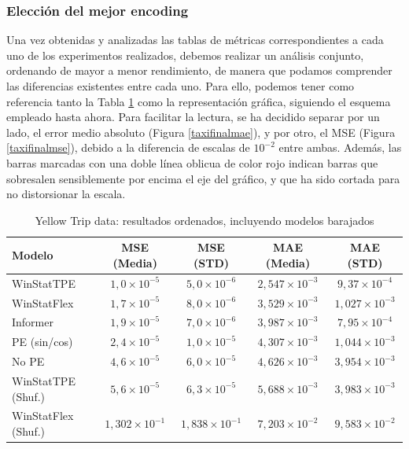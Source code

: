 \subsubsection{Elección del mejor encoding}

Una vez obtenidas y analizadas las tablas de métricas correspondientes a cada uno de los experimentos realizados, debemos realizar un análisis conjunto, ordenando de mayor a menor rendimiento, de manera que podamos comprender las diferencias existentes entre cada uno. Para ello, podemos tener como referencia tanto la Tabla \ref{taxifinal} como la representación gráfica, siguiendo el esquema empleado hasta ahora. Para facilitar la lectura, se ha decidido separar por un lado, el error medio absoluto (Figura \ref{taxifinalmae}), y por otro, el MSE (Figura \ref{taxifinalmse}), debido a la diferencia de escalas de $10^{-2}$ entre ambas. Además, las barras marcadas con una doble línea oblicua de color rojo indican barras que sobresalen sensiblemente por encima el eje del gráfico, y que ha sido cortada para no distorsionar la escala.\\


\begin{table}[!ht]
	\centering
	\begin{tabular}{l|c|c|c|c}
		\toprule
		Modelo & MSE (Media) & MSE (STD) & MAE (Media) & MAE (STD) \\
		\midrule
		WinStatTPE & $1,0 \times 10^{-5}$ & $5,0 \times 10^{-6}$ & $2,547 \times 10^{-3}$ & $9,37 \times 10^{-4}$ \\
		WinStatFlex & $1,7 \times 10^{-5}$ & $8,0 \times 10^{-6}$ & $3,529 \times 10^{-3}$ & $1,027 \times 10^{-3}$ \\
		Informer & $1,9 \times 10^{-5}$ & $7,0 \times 10^{-6}$ & $3,987 \times 10^{-3}$ & $7,95 \times 10^{-4}$ \\
		PE (sin/cos) & $2,4 \times 10^{-5}$ & $1,0 \times 10^{-5}$ & $4,307 \times 10^{-3}$ & $1,044 \times 10^{-3}$ \\
		No PE & $4,6 \times 10^{-5}$ & $6,0 \times 10^{-5}$ & $4,626 \times 10^{-3}$ & $3,954 \times 10^{-3}$ \\
		WinStatTPE (Shuf.) & $5,6 \times 10^{-5}$ & $6,3 \times 10^{-5}$ & $5,688 \times 10^{-3}$ & $3,983 \times 10^{-3}$ \\
		WinStatFlex (Shuf.) & $1,302 \times 10^{-1}$ & $1,838 \times 10^{-1}$ & $7,203 \times 10^{-2}$ & $9,583 \times 10^{-2}$ \\
		\bottomrule
	\end{tabular}
	\caption{Yellow Trip data: resultados ordenados, incluyendo modelos barajados}
	\label{taxifinal}
\end{table}


